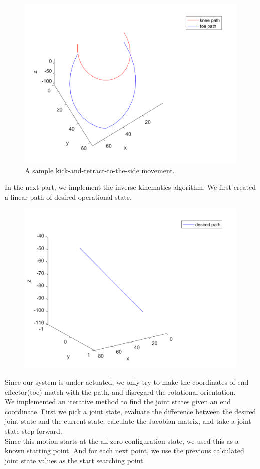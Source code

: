 \documentclass{article}
\begin{document}
\begin{figure}[H]
\centering
\includegraphics[width=\textwidth]{fk}
\caption{A sample kick-and-retract-to-the-side movement.}
\end{figure}

In the next part, we implement the inverse kinematics algorithm. We first created a linear path of desired operational state.

\begin{figure}[H]
\centering
\includegraphics[width=\textwidth]{desired}
\end{figure}

Since our system is under-actuated, we only try to make the coordinates of end effector(toe) match with the path, and disregard the rotational orientation.\\
We implemented an iterative method to find the joint states given an end coordinate. First we pick a joint state, evaluate the difference between the desired joint state and the current state, calculate the Jacobian matrix, and take a joint state step forward. \\
Since this motion starts at the all-zero configuration-state, we used this as a known starting point. And for each next point, we use the previous calculated joint state values as the start searching point.
\end{document}
